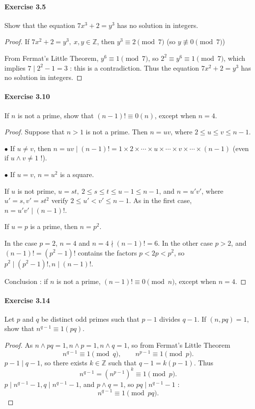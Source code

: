 \documentclass{article}
\begin{document}
\paragraph{Exercise 3.5} Show that the equation $7 x^{3}+2=y^{3}$ has no solution in integers.
\begin{proof}
    If $7x^2 + 2 = y^3,\ x,y \in \mathbb{Z}$, then $y^3 \equiv 2 \pmod 7$ (so $y \not \equiv 0 \pmod 7$)

From Fermat's Little Theorem, $y^6 \equiv 1 \pmod 7$, so $2^2 \equiv y^6 \equiv 1 \pmod 7$, which implies $7 \mid 2^2-1 = 3$ : this is a contradiction. Thus the equation $7x^2 + 2 = y^3$ has no solution in integers.
\end{proof}



\paragraph{Exercise 3.10} If $n$ is not a prime, show that $(n-1) ! \equiv 0(n)$, except when $n=4$.
\begin{proof}    
Suppose that $n >1$ is not a prime. Then $n = uv$, where $2 \leq u \leq v \leq n-1$.

$\bullet$ If $u \neq v$, then $n = uv \mid (n-1)! = 1\times 2 \times\cdots \times u \times\cdots \times v \times \cdots \times (n-1)$ (even if $u\wedge v \neq 1$ !).

$\bullet$ If $u=v$, $n = u^2$ is a square.

If $u$ is not prime, $u =st,\ 2\leq s \leq t \leq u-1 \leq n-1$, and $n = u' v'$, where $u' =s,v' =st^2$ verify  $2 \leq u' < v' \leq n-1$. As in the first case, $n = u'v' \mid (n-1)!$.  

If $u = p$ is a prime, then $n =p^2$.

In the case $p = 2$, $n = 4$ and $n=4  \nmid (n-1)! = 6$. In the other case $p >2$, and $(n-1)! = (p^2 - 1)!$ contains the factors $p < 2p < p^2$, so $p^2 \mid (p^2-1)!, n \mid (n-1)!$.

Conclusion : if $n$ is not a prime, $(n - 1)! \equiv 0 \pmod n$, except when $n=4$.
\end{proof}



\paragraph{Exercise 3.14} Let $p$ and $q$ be distinct odd primes such that $p-1$ divides $q-1$. If $(n, p q)=1$, show that $n^{q-1} \equiv 1(p q)$.
\begin{proof}    
As $n \wedge pq = 1, n\wedge p=1, n \wedge q = 1$, so from Fermat's Little Theorem
$$n^{q-1} \equiv 1 \pmod q,\qquad n^{p-1} \equiv 1 \pmod p.$$
$p-1 \mid q-1$, so there exists $k \in \mathbb{Z}$ such that $q-1 = k(p-1)$.
Thus
$$n^{q-1} = (n^{p-1})^k \equiv 1 \pmod p.$$
$p \mid n^{q-1} - 1, q \mid n^{q-1} - 1$, and $p\wedge q = 1$, so $pq \mid n^{q-1} - 1$ :
$$n^{q-1} \equiv 1 \pmod{pq}.$$
\end{proof}
\end{document}
